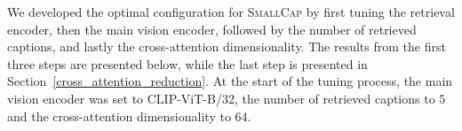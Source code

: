 \documentclass[10pt,twocolumn,letterpaper]{article}
\newcommand{\model}{\textsc{SmallCap}\xspace}
\begin{document}
\begin{table}[!h]
  \centering
  \hspace{.2cm}
  \hspace{.2cm}
  \caption{Hyperparameter tuning of the retrieval mechanism, measuring CIDEr on the validation set of COCO.}
  \label{tab:rsb}
\end{table}

We developed the optimal configuration for \model by first tuning the retrieval encoder, then the main vision encoder, followed by the number of retrieved captions, and lastly the cross-attention dimensionality. The results from the first three steps are presented below, while the last step is presented in Section~\ref{cross_attention_reduction}. At the start of the tuning process, the main vision encoder was set to CLIP-ViT-B/32, the number of retrieved captions to 5 and the cross-attention dimensionality to 64.
\end{document}
